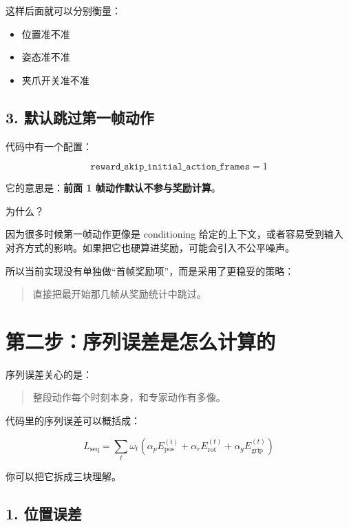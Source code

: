 \documentclass[12pt]{ctexart}
\begin{document}
这样后面就可以分别衡量：

\begin{itemize}
    \item 位置准不准
    \item 姿态准不准
    \item 夹爪开关准不准
\end{itemize}

\subsection{3. 默认跳过第一帧动作}

代码中有一个配置：

\begin{equation}
    \texttt{reward\_skip\_initial\_action\_frames} = 1
\end{equation}

它的意思是：\textbf{前面 1 帧动作默认不参与奖励计算}。

为什么？

因为很多时候第一帧动作更像是 conditioning 给定的上下文，或者容易受到输入对齐方式的影响。如果把它也硬算进奖励，可能会引入不公平噪声。

所以当前实现没有单独做“首帧奖励项”，而是采用了更稳妥的策略：

\begin{quote}
    直接把最开始那几帧从奖励统计中跳过。
\end{quote}

\section{第二步：序列误差是怎么计算的}

序列误差关心的是：

\begin{quote}
    整段动作每个时刻本身，和专家动作有多像。
\end{quote}

代码里的序列误差可以概括成：

\begin{equation}
    L_{\text{seq}} =
    \sum_t \omega_t
    \left(
    \alpha_p E^{(t)}_{\text{pos}}
    + \alpha_r E^{(t)}_{\text{rot}}
    + \alpha_g E^{(t)}_{\text{grip}}
    \right)
\end{equation}

你可以把它拆成三块理解。

\subsection{1. 位置误差}
\end{document}
